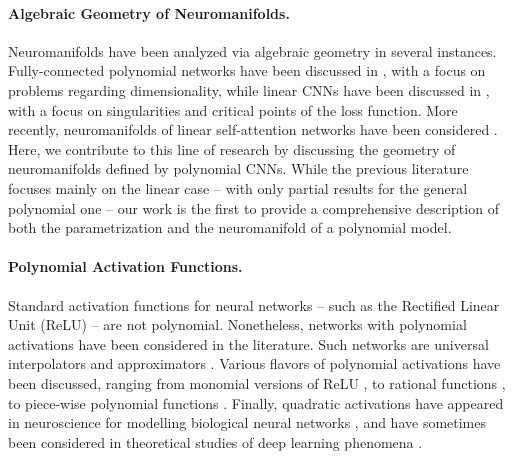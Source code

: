 \documentclass[twoside]{article}
\theoremstyle{plain}%
\theoremstyle{definition}
\theoremstyle{remark}
\begin{document}
\paragraph{Algebraic Geometry of Neuromanifolds.} Neuromanifolds have been analyzed via algebraic geometry in several instances. Fully-connected polynomial networks have been discussed in \parencite{kileel2019expressive, finkel2024activation}, with a focus on problems regarding dimensionality, while linear CNNs have been discussed in \parencite{kohn2022geometry, kohn2023function, shahverdi2024algebraic}, with a focus on singularities and critical points of the loss function. More recently, neuromanifolds of linear self-attention networks have been considered \parencite{henry2024geometrylightningselfattentionidentifiability}. Here, we contribute to this line of research by discussing the geometry of neuromanifolds defined by polynomial CNNs. While the previous literature focuses mainly on the linear case -- with only partial results for the general polynomial one -- our work is the first to provide a comprehensive description of both the parametrization and the neuromanifold of a polynomial model. 
\paragraph{Polynomial Activation Functions.} Standard activation functions for neural networks -- such as the Rectified Linear Unit (ReLU) -- are not polynomial. Nonetheless, networks with polynomial activations have been considered in the literature. Such networks are universal interpolators and approximators \parencite{constantinescu2023interpolation}. Various flavors of polynomial activations have been discussed, ranging from monomial versions of ReLU \parencite{berradi2018symmetric, li2019powernet}, to rational functions \parencite{boulle2020rational, telgarsky2017neural}, to piece-wise polynomial functions \parencite{lopez2019piecewise, hou2017convnets}. Finally, quadratic activations have appeared in neuroscience for modelling biological neural networks \parencite{adelson1985spatiotemporal}, and have sometimes been considered in theoretical studies of deep learning phenomena \parencite{gromov2023grokking, marchetti2024harmonics}. 
\end{document}
